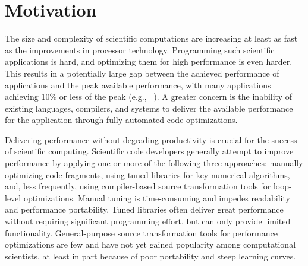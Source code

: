 \section{Motivation}
\label{sec:motivation}


The size and complexity of scientific computations are increasing at least as
fast as the improvements in processor technology.  Programming such
scientific applications is hard, and optimizing them for high performance is
even harder.  This results in a potentially large gap between the achieved
performance of applications and the peak available performance, with
many applications achieving 10\% or less of the peak (e.g.,~
\cite{conf/vecpar/CarterOS06}).  
A greater concern is the inability of existing languages, compilers, and
systems to deliver the available performance for the application through
fully automated code optimizations.

Delivering performance without degrading productivity is crucial for the
success of scientific computing. Scientific code developers generally attempt
to improve performance by applying one or more of the following three
approaches: manually optimizing code fragments, using tuned libraries for key
numerical algorithms, and, less frequently, using compiler-based source
transformation tools for loop-level optimizations. Manual tuning is
time-consuming and impedes readability and performance portability. Tuned
libraries often deliver great performance without requiring significant
programming effort, but can only provide limited
functionality. General-purpose source transformation tools for performance
optimizations are few and have not yet gained popularity among computational
scientists, at least in part because of poor portability and steep learning
curves.
